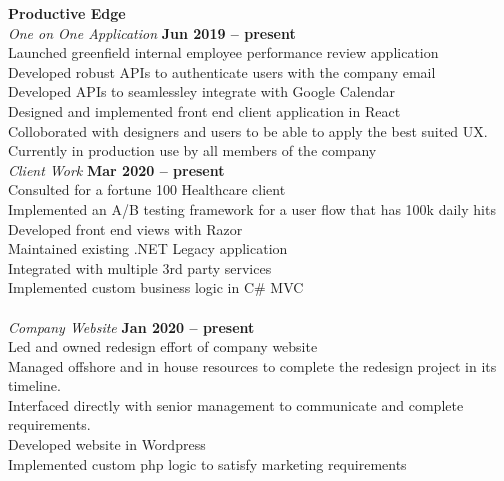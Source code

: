 \documentclass[margin,line]{resume}
\begin{document}
\begin{resume}
    \textbf{\listing Productive Edge} \vspace{2mm}\\\vspace{1mm}%
    \textsl{One on One Application} \hfill \textbf{Jun 2019 -- present}\\
    Launched greenfield internal employee performance review application\\
    Developed  robust APIs to authenticate users with the company email\\
    Developed APIs to seamlessley integrate with Google Calendar\\
    Designed and implemented front end client application in React\\
    Colloborated with designers and users to be able to apply the best suited UX.\\
    Currently in production use by all members of the company
    \textbf{\listing} \vspace{2mm}\\\vspace{1mm}%
    \textsl{Client Work} \hfill \textbf{Mar 2020 -- present}\\
    Consulted for a fortune 100 Healthcare client \\
    Implemented an A/B testing framework for a user flow that has 100k daily hits\\
    Developed front end views with Razor\\
    Maintained existing .NET Legacy application\\
    Integrated with multiple 3rd party services\\ 
    Implemented custom business logic in C\# MVC\\
     \textbf{\listing} \vspace{0mm}\\\vspace{1mm}%
    \textsl{Company Website} \hfill \textbf{Jan 2020 -- present}\\
    Led and owned redesign effort of company website\\
    Managed offshore and in house resources to complete the redesign project in its timeline.\\
    Interfaced directly with senior management to communicate and complete requirements.\\
    Developed website in Wordpress\\
    Implemented custom php logic to satisfy marketing requirements\\


\end{resume}
\end{document}
